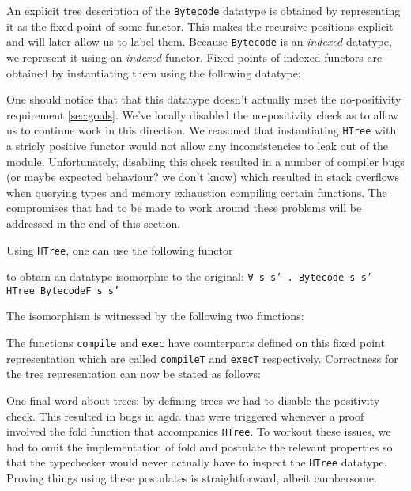 \documentclass[a4paper]{article}
\begin{document}
        An explicit tree description of the \texttt{Bytecode} datatype is obtained by representing it as the fixed point of 
        some functor. This makes the recursive positions explicit and will later allow us to label them. Because \texttt{Bytecode} 
        is an \emph{indexed} datatype, we represent it using an \emph{indexed} functor. Fixed points of indexed functors are obtained 
        by instantiating them using the following datatype:
        
        
        
        One should notice that that this datatype doesn't actually meet the no-positivity requirement \ref{sec:goals}. We've locally disabled the 
        no-positivity check as to allow us to continue work in this direction. We reasoned that instantiating \texttt{HTree} with a stricly 
        positive functor would not allow any inconsistencies to leak out of the module. Unfortunately, disabling this check resulted in a number
        of compiler bugs (or maybe expected behaviour? we don't know) which resulted in stack overflows when querying types and memory exhaustion
        compiling certain functions. The compromises that had to be made to work around these problems will be addressed in the end of this section.
        
        Using \texttt{HTree}, one can use the following functor
        
 
        to obtain an datatype isomorphic to the original: \texttt{∀ s s' . Bytecode s s' ~ HTree BytecodeF s s'}
        
        The isomorphism is witnessed by the following two functions:
        
        
        The functions \texttt{compile} and \texttt{exec} have counterparts defined on this fixed point representation 
        which are called \texttt{compileT} and \texttt{execT} respectively. Correctness for the tree representation can now be stated as follows:
        
        
        
        
        
        One final word about trees: by defining trees we had to disable the positivity check. This resulted in bugs in agda that were triggered 
        whenever a proof involved the fold function that accompanies \texttt{HTree}. To workout these issues, we had to omit the implementation of fold
        and postulate the relevant properties so that the typechecker would never actually have to inspect the \texttt{HTree} datatype. Proving things using
        these postulates is straightforward, albeit cumbersome.  
        
\end{document}
